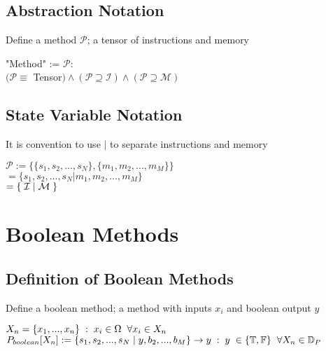 \documentclass[11pt]{article}
\begin{document}
\subsection{Abstraction Notation}
Define a method $\mathcal{P}$; a tensor of instructions and memory
\begin{center}
"Method" := $
\mathcal{P} :
$
\\ \vspace{2mm}
$
(\mathcal{P} \equiv$ Tensor$)\land(\mathcal{P} \supseteq \mathcal{I})\land(\mathcal{P} \supseteq \mathcal{M})
$
\end{center}




\subsection{State Variable Notation}
It is convention to use $|$ to separate instructions and memory 
\begin{center}
$
\mathcal{P} := \{ \{s_1, s_2,...,s_{N}\},\{ m_1, m_2,...,m_M \} \}
$
\\ \vspace{2mm}
$
= \{ s_1, s_2,...,s_{N} | m_1, m_2,...,m_M\}
$
\\ \vspace{2mm}
$
= \{\hspace{1mm} \mathcal{I} \hspace{1mm}|\hspace{1mm} \mathcal{M} \hspace{1mm} \}
$
\end{center}








\newpage

\section{Boolean Methods}
\subsection{Definition of Boolean Methods}
Define a boolean method; a method with inputs $x_i$ and boolean output $y$
\begin{center}
$
X_n = \{x_1,...,x_n\} \hspace{1mm} : \hspace{1mm} x_i \in \Omega \hspace{2mm} \forall x_i \in X_n
$
\\ \vspace{2mm}
$
P_{boolean}\lbrack X_n \rbrack := \{ s_1,s_2,...,s_{N}\hspace{1mm}|\hspace{1mm} y, b_2,...,b_M\} \rightarrow y \hspace{1mm} : \hspace{1mm} y \hspace{1mm} \in  \{\mathbb{T},\mathbb{F}\} \hspace{2mm} \forall X_n \in \mathbb{D}_{P}
$
\end{center}
\end{document}
